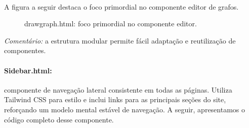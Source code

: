 \documentclass[12pt,a4paper]{article}
\def\texttt#1{#1}%
\def\_{}%
\begin{document}
\paragraph{}
A figura a seguir destaca o foco primordial no componente editor de grafos.

\begin{figure}[H]\centering
{}
\caption{\texttt{draw\_graph.html}: foco primordial no componente editor.}
\end{figure}
\textit{Comentário:} a estrutura modular permite fácil adaptação e reutilização de componentes. 

\paragraph{\texttt{Sidebar.html}:} componente de navegação lateral consistente em todas as páginas. Utiliza Tailwind CSS para estilo e inclui links para as principais seções do site, reforçando um modelo mental estável de navegação. A seguir, apresentamos o código completo desse componente.
\end{document}
